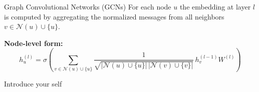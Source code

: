 \documentclass[aspectratio=169]{beamer}
\renewcommand{\alert}[1]{\textbf{\color{swufe}#1}}
\begin{document}
        \begin{frame}{Graph Convolutional Networks (GCNs)}
            For each node $u$ the embedding at layer $l$ is computed by aggregating the normalized messages from all neighbors $v \in \mathcal{N}(u) \cup \{u\}$. \newline

            \alert{Node-level form:}
            \begin{equation}
                h_u^{(l)} = \sigma\left(\sum_{v \in \mathcal{N}(u) \cup \{u\}} \frac{1}{\sqrt{|\mathcal{N}(u) \cup \{u\}| \, |\mathcal{N}(v) \cup \{v\}|}}\, h_v^{(l-1)} W^{(l)}\right)
            \end{equation}

            \begin{note}
                {Introduce your self}
            \end{note}
        \end{frame}
\end{document}
